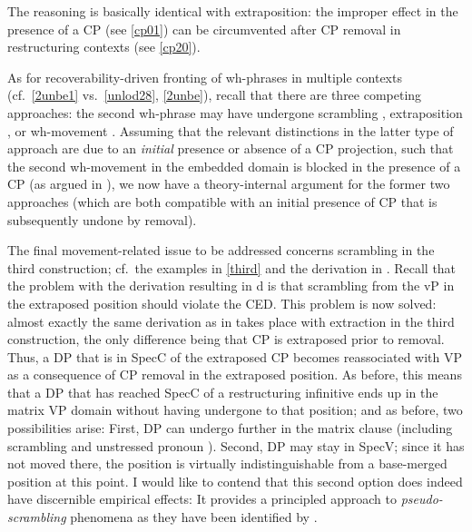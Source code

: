 \documentclass[output=paper]{langsci/langscibook}
\begin{document}
The reasoning is basically identical with extraposition: the improper 
effect in the presence of a CP (see \ref{cp01}) can be circumvented after CP
removal in restructuring contexts (see \ref{cp20}).

As for recoverability-driven fronting of wh-phrases in multiple 
contexts (cf.\ \ref{2unbe1} vs.\ \ref{unlod28}, \ref{2unbe}), recall that
there are three competing approaches: the second wh-phrase may have undergone
scrambling \parencite{Sauerland:99:loc}, extraposition
\parencite{Lasnik:14:mul}, or wh-movement \parencite{Heck&Mueller:03:vers}.
Assuming that the relevant distinctions in the latter type of approach are due
to an {\itshape initial} presence or absence of a CP projection, such that the
second wh-movement in the embedded domain is blocked in the presence of a CP
(as argued in \citealt{Heck&Mueller:03:vers}), we now have a theory-internal
argument for the former two approaches (which are both compatible with an
initial presence of CP that is subsequently undone by removal).

The final movement-related issue to be addressed concerns scrambling in the
third construction; cf.\ the examples in \eqref{third} and the derivation in
. Recall that the problem with the derivation resulting in
d is that scrambling from the vP in the extraposed position
should violate the \gls{CED}.  This problem is now solved: almost exactly the
same derivation as in  takes place with extraction in the third
construction, the only difference being that CP is extraposed prior to removal.
Thus, a DP that is in SpecC of the extraposed CP becomes reassociated with VP
as a consequence of CP removal in the extraposed position. As before, this
means that a DP that has reached SpecC of a restructuring infinitive ends up in
the matrix VP domain without having undergone  to that position; and as
before, two possibilities arise:  First, DP can undergo further  in the
matrix clause (including scrambling and unstressed pronoun ). Second,
DP may stay in SpecV; since it has not moved there, the position is virtually
indistinguishable from a base-merged position at this point. I would like to
contend that this second option does indeed have discernible empirical effects:
It  provides a principled approach to {\itshape pseudo-scrambling} phenomena as they
have been identified by \citet{Geilfuss:91}.
\end{document}
